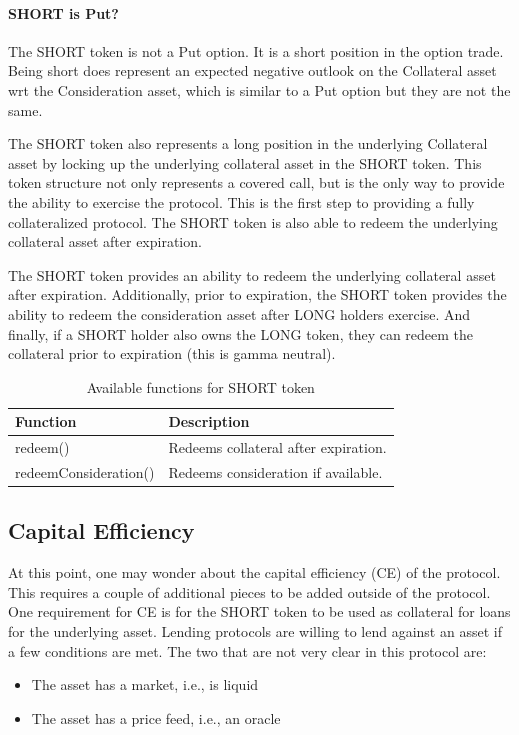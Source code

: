 \documentclass[%
 reprint,
 amsmath,amssymb,
 aps,
]{revtex4-2}
\begin{document}
\paragraph*{SHORT is Put?} The SHORT token is not a Put option. It is a short position in the option trade. 
Being short does represent an expected negative outlook on the Collateral asset wrt the Consideration asset, 
which is similar to a Put option but they are not the same.



The SHORT token also represents a long position in the underlying Collateral asset by locking up the underlying collateral asset in the SHORT token.
This token structure not only represents a covered call, but is the only way to provide the ability to exercise the protocol.
This is the first step to providing a fully collateralized protocol.
The SHORT token is also able to redeem the underlying collateral asset after expiration.

The SHORT token provides an ability to redeem the underlying collateral asset after expiration.
Additionally, prior to expiration, the SHORT token provides the ability to redeem the consideration asset after LONG holders exercise.
And finally, if a SHORT holder also owns the LONG token, they can redeem the collateral prior to expiration (this is gamma neutral).

\begin{table}[h]
\centering
\begin{tabular}{|p{4cm}|p{4cm}|}
\hline
\textbf{Function} & \textbf{Description} \\
\hline
redeem() & Redeems collateral after expiration. \\
\hline
redeemConsideration() & Redeems consideration if available. \\ 
\hline
\end{tabular}
\caption{Available functions for SHORT token}
\label{tab:functions}
\end{table}


\subsection{Capital Efficiency}

At this point, one may wonder about the capital efficiency (CE) of the protocol. 
This requires a couple of additional pieces to be added outside of the protocol.
One requirement for CE is for the SHORT token to be used as collateral for loans for the underlying asset.
Lending protocols are willing to lend against an asset if a few conditions are met. 
The two that are not very clear in this protocol are:
\begin{itemize}
  \setlength{\itemsep}{0pt}
  \setlength{\parskip}{0pt}
  \item The asset has a market, i.e., is liquid
  \item The asset has a price feed, i.e., an oracle
\end{itemize}
\end{document}
